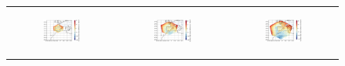 \begin{figure}[htbp]
\begin{tabular}{ccc}
        \begin{subfigure}[b]{0.33\textwidth}
            \caption{}
            \includegraphics[width=\textwidth]{images/chap4/domain_size/diff_map_SWdnSFC_era_LAM_1000km_NBP40.png}
        \end{subfigure} &
        \begin{subfigure}[b]{0.33\textwidth}
            \caption{}
            \includegraphics[width=\textwidth]{images/chap4/domain_size/diff_map_SWdnSFC_era_LAM_1500km_NBP60.png}
        \end{subfigure} &
        \begin{subfigure}[b]{0.33\textwidth}
            \caption{}
            \includegraphics[width=\textwidth]{images/chap4/domain_size/diff_map_SWdnSFC_era_LAM_2000km_NBP80.png}
        \end{subfigure} \\
        

\end{tabular}
\end{figure}
